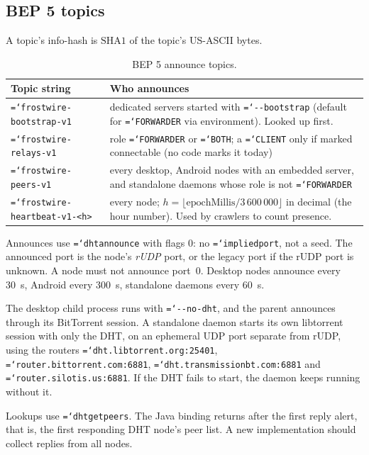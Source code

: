 \documentclass[11pt,a4paper]{article}
\newcommand{\code}[1]{\texttt{\hyphenchar\font=`\-\relax #1}}
\DeclareRobustCommand{\_}{\origunderscore\allowbreak}
\begin{document}
\subsection{BEP 5 topics}
A topic's info-hash is $\mathrm{SHA1}$ of the topic's US-ASCII bytes.

\begin{table}[ht]
\centering\small
\begin{tabularx}{\textwidth}{lL}
\toprule
Topic string & Who announces\\
\midrule
\code{frostwire-bootstrap-v1} & dedicated servers started with \code{-{}-bootstrap} (default for \code{FORWARDER} via environment). Looked up first.\\
\code{frostwire-relays-v1} & role \code{FORWARDER} or \code{BOTH}; a \code{CLIENT} only if marked connectable (no code marks it today)\\
\code{frostwire-peers-v1} & every desktop, Android nodes with an embedded server, and standalone daemons whose role is not \code{FORWARDER}\\
\code{frostwire-heartbeat-v1-<h>} & every node; $h = \lfloor \mathrm{epochMillis} / 3\,600\,000 \rfloor$ in decimal (the hour number). Used by crawlers to count presence.\\
\bottomrule
\end{tabularx}
\caption{BEP 5 announce topics.}
\label{tab:topics}
\end{table}

Announces use \code{dht\_announce} with flags 0: no \code{implied\_port}, not a seed. The
announced port is the node's \emph{rUDP} port, or the legacy port if the rUDP port is
unknown. A node must not announce port~0. Desktop nodes announce every 30~s, Android every
300~s, standalone daemons every 60~s.

The desktop child process runs with \code{-{}-no-dht}, and the parent announces through its
BitTorrent session. A standalone daemon starts its own libtorrent session with only the DHT,
on an ephemeral UDP port separate from rUDP, using the routers
\code{dht.libtorrent.org:25401}, \code{router.bittorrent.com:6881},
\code{dht.transmissionbt.com:6881} and \code{router.silotis.us:6881}. If the DHT fails to
start, the daemon keeps running without it.

Lookups use \code{dht\_get\_peers}. The Java binding returns after the first reply alert,
that is, the first responding DHT node's peer list. A new implementation should collect
replies from all nodes.
\end{document}
